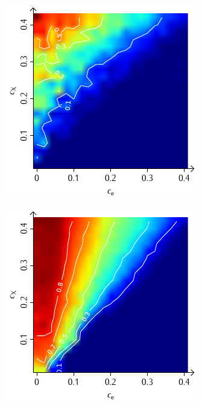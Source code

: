 \documentclass[a4paper, 10pt, twoside, openany]{book} %
\begin{document}
\begin{figure}
\begin{minipage}[t]{0.48\textwidth}
			\label{F_random_K}
		\end{minipage}
		\hfill
		\begin{minipage}[t]{0.48\textwidth}
			\includegraphics[width=\textwidth]{Abbildungen/Phasendiagramme/Konturen/F_penalty_random_K.pdf}
			\label{F_penalty_random_K}
		\end{minipage}
		\begin{minipage}[t]{0.48\textwidth}
			\includegraphics[width=\textwidth]{Abbildungen/Phasendiagramme/Konturen/F_individual_K.pdf}

\end{minipage}
\end{figure}
\end{document}
